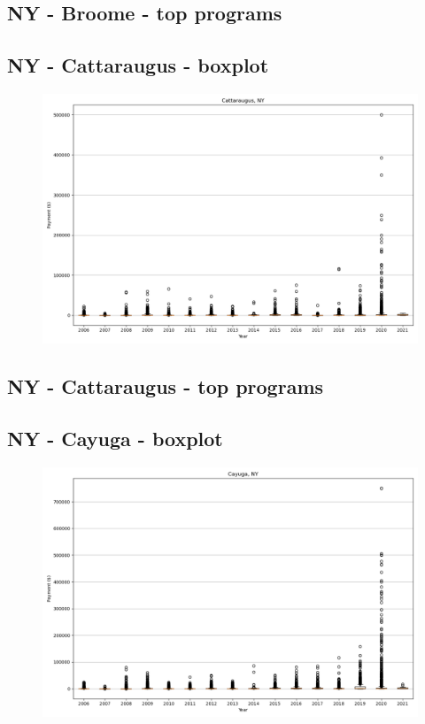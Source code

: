 \subsection*{NY - Broome - top programs}

\newpage
\subsection*{NY - Cattaraugus - boxplot}
\begin{figure}[h]
\centering
\includegraphics[width=7in]{../output/boxplots/counties/Cattaraugus-NY_boxplot.png}
\end{figure}


\subsection*{NY - Cattaraugus - top programs}

\newpage
\subsection*{NY - Cayuga - boxplot}
\begin{figure}[h]
\centering
\includegraphics[width=7in]{../output/boxplots/counties/Cayuga-NY_boxplot.png}
\end{figure}


